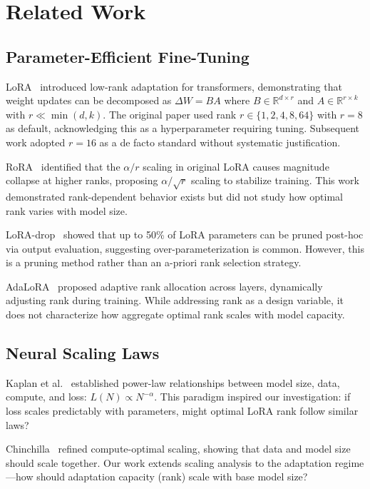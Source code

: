 \section{Related Work}

\subsection{Parameter-Efficient Fine-Tuning}

LoRA~\cite{hu2021lora} introduced low-rank adaptation for transformers, demonstrating that weight updates can be decomposed as $\Delta W = BA$ where $B \in \mathbb{R}^{d \times r}$ and $A \in \mathbb{R}^{r \times k}$ with $r \ll \min(d,k)$. The original paper used rank $r \in \{1, 2, 4, 8, 64\}$ with $r=8$ as default, acknowledging this as a hyperparameter requiring tuning. Subsequent work adopted $r=16$ as a de facto standard without systematic justification.

RoRA~\cite{rora2025} identified that the $\alpha/r$ scaling in original LoRA causes magnitude collapse at higher ranks, proposing $\alpha/\sqrt{r}$ scaling to stabilize training. This work demonstrated rank-dependent behavior exists but did not study how optimal rank varies with model size.

LoRA-drop~\cite{loradrop2024} showed that up to 50\% of LoRA parameters can be pruned post-hoc via output evaluation, suggesting over-parameterization is common. However, this is a pruning method rather than an a-priori rank selection strategy.

AdaLoRA~\cite{adalora2023} proposed adaptive rank allocation across layers, dynamically adjusting rank during training. While addressing rank as a design variable, it does not characterize how aggregate optimal rank scales with model capacity.

\subsection{Neural Scaling Laws}

Kaplan et al.~\cite{kaplan2020scaling} established power-law relationships between model size, data, compute, and loss: $L(N) \propto N^{-\alpha}$. This paradigm inspired our investigation: if loss scales predictably with parameters, might optimal LoRA rank follow similar laws?

Chinchilla~\cite{hoffmann2022training} refined compute-optimal scaling, showing that data and model size should scale together. Our work extends scaling analysis to the adaptation regime---how should adaptation capacity (rank) scale with base model size?

